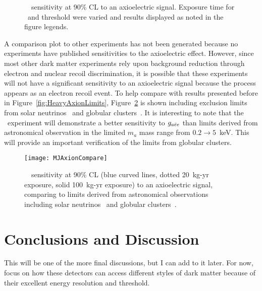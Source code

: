 			\begin{figure}
				\centering
				\def\figheight{0.41\textheight}
				\caption[\MJ~\minmod~sensitivity at 90\% CL to an axioelectric signal]{
				\MJ~\minmod~sensitivity at 90\% CL to an axioelectric signal.  Exposure time for \hthree~and threshold were varied and results displayed as noted
				in the figure legends.}
				\label{fig:MJSensitivityToAxion}
			\end{figure}	
				
	A comparison plot to other experiments has not been generated because no experiments have published sensitivities to the axioelectric effect.  However, since most other dark matter experiments rely upon background reduction through electron and nuclear recoil discrimination, it is possible that these experiments will not have a significant sensitivity to an axioelectric signal because the process appears as an electron recoil event.  To help compare with results presented before in Figure~\ref{fig:HeavyAxionLimits}, Figure~\ref{fig:MJSensitivityToHeavyAxionsCompare} is shown including exclusion limits from solar neutrinos~\cite{Gondolo09} and globular clusters~\cite{Raffelt95}.  It is interesting to note that the \MJ~experiment will demonstrate a better sensitivity to $g_{a\bar{e}e}$ than limits derived from astronomical observation in the limited $m_{a}$ mass range from $0.2\to5$~keV.  This will provide an important verification of the limits from globular clusters.
					
			\begin{figure}
				\centering
				\texttt{[image: MJAxionCompare]}
				\caption{\MJ~\minmod~sensitivity at 90\% CL (blue curved lines, dotted 20~kg-yr exposure, solid 100~kg-yr exposure) to an axioelectric signal, 
				comparing to limits derived from astronomical observations including solar neutrinos~\cite{Gondolo09} and globular clusters~\cite{Raffelt95}.}
				\label{fig:MJSensitivityToHeavyAxionsCompare}
			\end{figure}							

	\section{Conclusions and Discussion}
	\label{sec:OtherLowEnergyConclusions}	
	
	
	
	This will be one of the more final discussions, but I can add to it later.  For now, focus on how these detectors can access different styles of dark matter because of their excellent energy resolution and threshold.  
